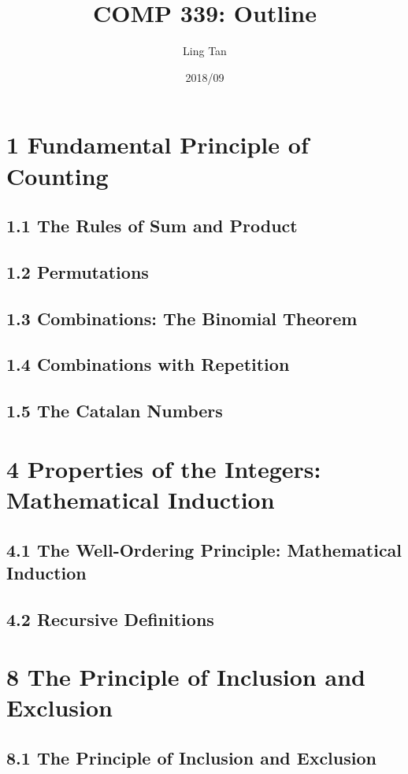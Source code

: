 \documentclass[a4paper]{article}
\title{COMP 339: Outline}
\author{Ling Tan}
\date{2018/09}
\begin{document}
\maketitle

\section*{1 Fundamental Principle of Counting}
\subsection*{1.1 The Rules of Sum and Product}
\subsection*{1.2 Permutations}
\subsection*{1.3 Combinations: The Binomial Theorem}
\subsection*{1.4 Combinations with Repetition}
\subsection*{1.5 The Catalan Numbers}

\section*{4 Properties of the Integers: Mathematical Induction}
\subsection*{4.1 The Well-Ordering Principle: Mathematical Induction}
\subsection*{4.2 Recursive Definitions}

\section*{8 The Principle of Inclusion and Exclusion}
\subsection*{8.1 The Principle of Inclusion and Exclusion}
\end{document}
